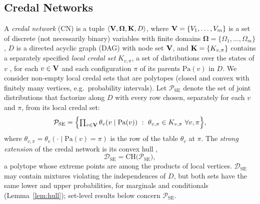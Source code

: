 \documentclass{article} %
\DeclareRobustCommand{\rev}[1]{{\color{blue}#1}}
\newcommand{\DSE}{\mathcal{D}_{\mathrm{SE}}}
\providecommand{\Pa}{\mathrm{Pa}}
\begin{document}
\subsection{Credal Networks}
\label{sec-cn}
A \emph{credal network} (CN) \citep{cozman2000credal} is a tuple $\langle \mathbf{V}, \boldsymbol\Omega, \mathbf{K}, D \rangle$, where $\mathbf{V}=\{V_1, \ldots, V_m\}$ is a set of discrete (not necessarily binary) variables with finite domains $\boldsymbol\Omega=\{\Omega_1, \ldots, \Omega_m\}$, $D$ is a directed acyclic graph (DAG) with node set $\mathbf{V}$, and $\mathbf{K}=\{K_{v,\pi}\}$ contains a separately specified \emph{local credal set} $K_{v,\pi}$, a set of distributions over the states of $v$ \citep{levi80book}, for each $v\in\mathbf{V}$ and each configuration $\pi$ of its parents $\Pa(v)$ in $D$. We consider non-empty local credal sets that are polytopes (closed and convex with finitely many vertices, e.g.\ probability intervals). Let $\mathcal P_{\mathrm{SE}}$ denote the set of joint distributions that factorize along $D$ with every row chosen, separately for each $v$ and $\pi$, from its local credal set:
\begin{equation}\label{eq:pse}
    \mathcal P_{\mathrm{SE}}=\Bigl\{\textstyle\prod_{v\in\bV} \theta_v(v\mid \Pa(v))~:~ \theta_{v,\pi} \in K_{v,\pi}\ \forall v,\pi\Bigr\},
\end{equation}
where $\theta_{v,\pi}=\theta_v(\cdot\mid\Pa(v){=}\pi)$ is the row of the table $\theta_v$ at $\pi$. The \emph{strong extension} of the credal network is its convex hull \citep{cozman2000credal,maua2020ijar},
\begin{equation}\label{eq:se}
    \DSE=\textrm{CH}\bigl(\mathcal P_{\mathrm{SE}}\bigr),
\end{equation}
a polytope whose extreme points are among the products of local vertices. \rev{$\DSE$ may contain mixtures violating the independences of $D$, but both sets have the same lower and upper probabilities, for marginals and conditionals (Lemma~\ref{lem:hull}); set-level results below concern $\mathcal P_{\mathrm{SE}}$.}
\end{document}
